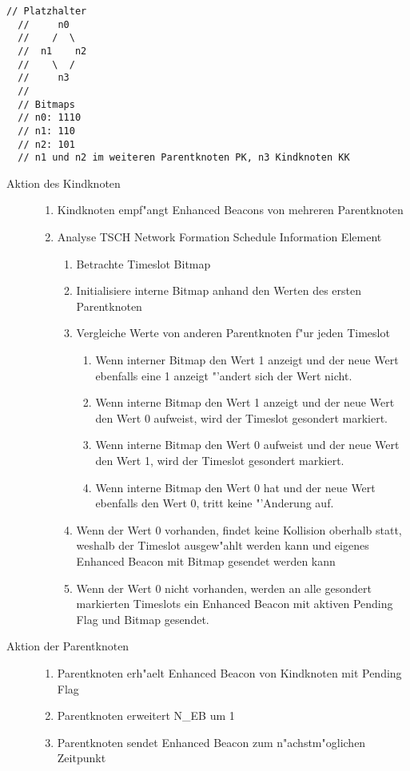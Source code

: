 \begin{description}
  \begin{lstlisting}[frame=single]
  // Platzhalter
  //     n0
  //    /  \
  //  n1    n2
  //    \  /
  //     n3
  //
  // Bitmaps
  // n0: 1110
  // n1: 110
  // n2: 101
  // n1 und n2 im weiteren Parentknoten PK, n3 Kindknoten KK
  \end{lstlisting}
  \begin{description}
  \item [Aktion des Kindknoten]
    \begin{enumerate}
      \item Kindknoten empf"angt Enhanced Beacons von mehreren Parentknoten
      \item Analyse TSCH Network Formation Schedule Information Element
      \begin{enumerate}
        \item Betrachte Timeslot Bitmap
        \item Initialisiere interne Bitmap anhand den Werten des ersten Parentknoten
        \item Vergleiche Werte von anderen Parentknoten f"ur jeden Timeslot
        \begin{enumerate}
          \item Wenn interner Bitmap den Wert 1 anzeigt und der neue Wert ebenfalls
          eine 1 anzeigt "'andert sich der Wert nicht.
          \item Wenn interne Bitmap den Wert 1 anzeigt und der neue Wert den Wert 0
          aufweist, wird der Timeslot gesondert markiert.
          \item Wenn interne Bitmap den Wert 0 aufweist und der neue Wert den Wert 1,
          wird der Timeslot gesondert markiert.
          \item Wenn interne Bitmap den Wert 0 hat und der neue Wert ebenfalls
          den Wert 0, tritt keine "'Anderung auf.
        \end{enumerate}
        \item Wenn der Wert 0 vorhanden, findet keine Kollision oberhalb statt,
        weshalb der Timeslot ausgew"ahlt werden kann und eigenes Enhanced Beacon
        mit Bitmap gesendet werden kann
        \item Wenn der Wert 0 nicht vorhanden, werden an alle gesondert markierten
        Timeslots ein Enhanced Beacon mit aktiven Pending Flag und Bitmap gesendet.
      \end{enumerate}
    \end{enumerate}
  \item [Aktion der Parentknoten]
    \begin{enumerate}
      \item Parentknoten erh"aelt Enhanced Beacon von Kindknoten mit Pending Flag
      \item Parentknoten erweitert N\_EB um 1
      \item Parentknoten sendet Enhanced Beacon zum n"achstm"oglichen Zeitpunkt
    \end{enumerate}
  \end{description}
\end{description}


